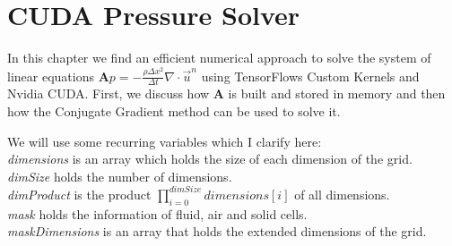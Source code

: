 \chapter{CUDA Pressure Solver}\label{chapter:cudapressuresolver}
In this chapter we find an efficient numerical approach to solve the system of linear equations $\mathbf{A}p = -\frac{\rho \Delta x^2}{\Delta t}\nabla \cdot \vec{u}^n$ using TensorFlows Custom Kernels and Nvidia CUDA. First, we discuss how \textbf{A} is built and stored in memory and then how the Conjugate Gradient method can be used to solve it. 
\par We will use some recurring variables which I clarify here:\\
\textit{dimensions} is an array which holds the size of each dimension of the grid.\\
\textit{dimSize} holds the number of dimensions.\\
\textit{dimProduct} is the product $\prod_{i=0}^{dimSize} \textit{dimensions}[i]$ of all dimensions. \\
\textit{mask} holds the information of fluid, air and solid cells.\\
\textit{maskDimensions} is an array that holds the  extended dimensions of the grid.\\

